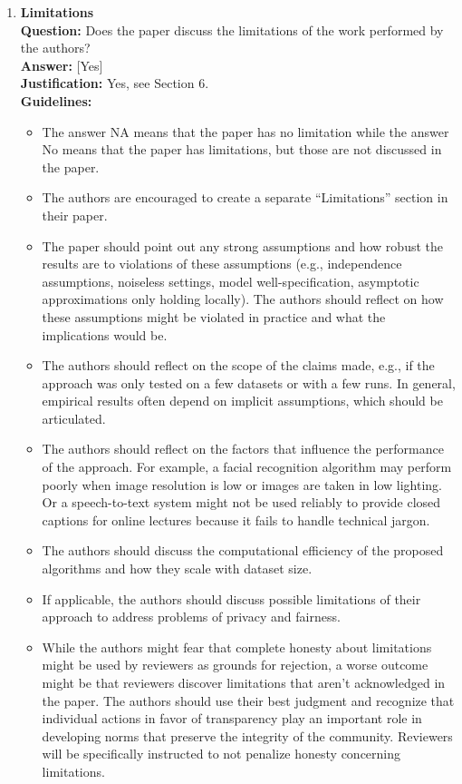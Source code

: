 \begin{enumerate}
\item \textbf{Limitations}\\
\textbf{Question:} Does the paper discuss the limitations of the work performed by the authors?\\
\textbf{Answer:} [Yes]\\
\textbf{Justification:} Yes, see Section 6.\\
\textbf{Guidelines:}
\begin{itemize}
\item The answer NA means that the paper has no limitation while the answer No means that the paper has limitations, but those are not discussed in the paper.
\item The authors are encouraged to create a separate ``Limitations'' section in their paper.
\item The paper should point out any strong assumptions and how robust the results are to violations of these assumptions (e.g., independence assumptions, noiseless settings, model well-specification, asymptotic approximations only holding locally). The authors should reflect on how these assumptions might be violated in practice and what the implications would be.
\item The authors should reflect on the scope of the claims made, e.g., if the approach was only tested on a few datasets or with a few runs. In general, empirical results often depend on implicit assumptions, which should be articulated.
\item The authors should reflect on the factors that influence the performance of the approach. For example, a facial recognition algorithm may perform poorly when image resolution is low or images are taken in low lighting. Or a speech-to-text system might not be used reliably to provide closed captions for online lectures because it fails to handle technical jargon.
\item The authors should discuss the computational efficiency of the proposed algorithms and how they scale with dataset size.
\item If applicable, the authors should discuss possible limitations of their approach to address problems of privacy and fairness.
\item While the authors might fear that complete honesty about limitations might be used by reviewers as grounds for rejection, a worse outcome might be that reviewers discover limitations that aren't acknowledged in the paper. The authors should use their best judgment and recognize that individual actions in favor of transparency play an important role in developing norms that preserve the integrity of the community. Reviewers will be specifically instructed to not penalize honesty concerning limitations.
\end{itemize}


\end{enumerate}
